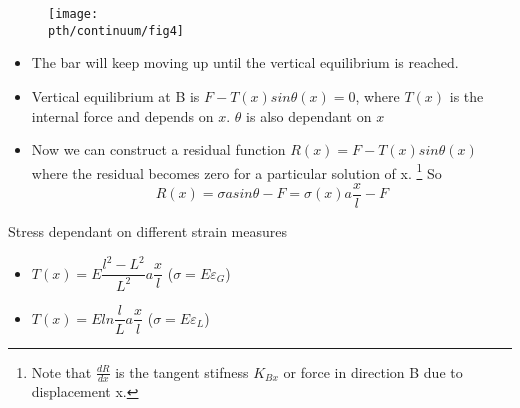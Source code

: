 	\begin{frame}
		\begin{figure}
			\centering
			\texttt{[image: \\pth/continuum/fig4]}
			\label{fig:fig1}
		\end{figure}
		\begin{itemize}
		\item The bar will keep moving up until the vertical equilibrium is reached.
		\item Vertical equilibrium at B is $F - T(x)sin \theta(x) = 0$, where $T(x)$ is the internal force and depends on $x$. $\theta$ is also dependant on $x$
		\item Now we can construct a residual function $R(x) =  F - T(x)sin \theta(x)$ where the residual becomes zero for a particular solution of x. \footnote{Note that $\frac{d R}{d x}$ is the tangent stifness $K_{Bx}$ or force in direction B due to displacement x.}  So
		\begin{equation}
		R(x) = \sigma a sin \theta - F = \sigma(x) a \frac{ x}{l} - F
		\end{equation} 	
		\end{itemize}
		
		\begin{block}{Stress dependant on different strain measures}
			\begin{itemize}
				\item $T(x) = E \dfrac{l^2-L^2}{L^2} a \dfrac{x}{l}$  \hfill ($\sigma =  E \varepsilon_G$)
				\item $T(x) = E ln\dfrac{l}{L} a \dfrac{x}{l}$ \hfill	($\sigma =  E \varepsilon_L$)			
			\end{itemize}
		\end{block}
	\end{frame}

